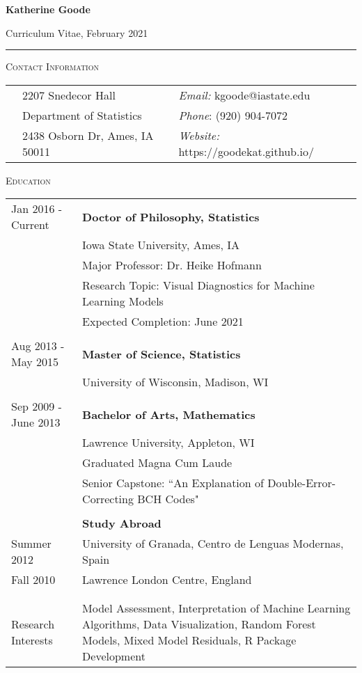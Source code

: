 \documentclass[10pt, oneside]{article}
\begin{document}
\begin{LARGE} \noindent\textbf{Katherine Goode} \end{LARGE} \hfill Curriculum Vitae, February 2021\\
\rule{\textwidth}{1pt}

\vspace{0.25cm}

\noindent \textsc{Contact Information} \hrulefill
\begin{longtable}{p{3.9cm}p{6.5cm}p{6.5cm}}
& 2207 Snedecor Hall & \emph{Email:} kgoode@iastate.edu\\
& Department of Statistics & \emph{Phone}: (920) 904-7072\\
& 2438 Osborn Dr, Ames, IA 50011 & \emph{Website:} https://goodekat.github.io/
\end{longtable}

\noindent \textsc{Education} \hrulefill
\begin{longtable}{p{3.5cm}p{13cm}}
\hfill{Jan 2016 - Current} & \textbf{Doctor of Philosophy, Statistics}\\
& Iowa State University, Ames, IA\\
& Major Professor: Dr. Heike Hofmann\\
& Research Topic: Visual Diagnostics for Machine Learning Models\\
& Expected Completion: June 2021\\
\\
\hfill{Aug 2013 - May 2015} & \textbf{Master of Science, Statistics}\\
& University of Wisconsin, Madison, WI\\
\\
\hfill{Sep 2009 - June 2013} & \textbf{Bachelor of Arts, Mathematics}\\
& Lawrence University, Appleton, WI\\
& Graduated Magna Cum Laude\\
& Senior Capstone: ``An Explanation of Double-Error-Correcting BCH Codes"\\
\\
& \textbf{Study Abroad}\\
\hfill{Summer 2012} & \indent University of Granada, Centro de Lenguas Modernas, Spain\\
\hfill{Fall 2010} & \indent Lawrence London Centre, England\\
\\
\\
\hfill{Research Interests} & Model Assessment, Interpretation of Machine Learning Algorithms, Data Visualization, Random Forest Models, Mixed Model Residuals, R Package Development\\
\end{longtable}
\end{document}
